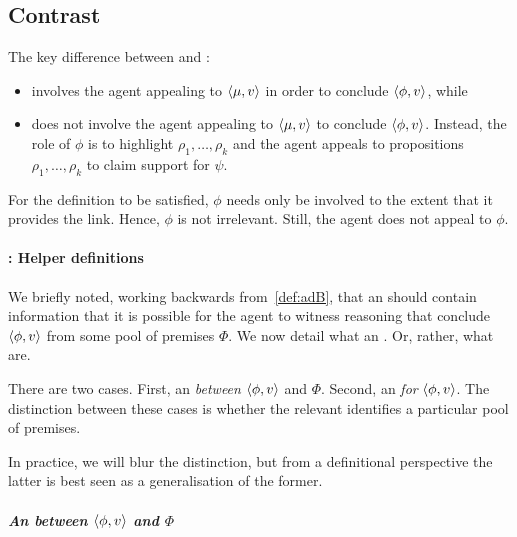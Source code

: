 \subsection{Contrast}

\begin{note}
  The key difference between \adA{} and \adB{}:
  \begin{itemize}
  \item \adA{} involves the agent appealing to \(\langle \mu, v \rangle\) in order to conclude \(\langle \phi, v \rangle\), while
  \item \adB{} does not involve the agent appealing to \(\langle \mu, v \rangle\) to conclude \(\langle \phi, v \rangle\).
    Instead, the role of \(\phi\) is to highlight \(\rho_{1},\dots,\rho_{k}\) and the agent appeals to propositions \(\rho_{1},\dots,\rho_{k}\) to claim support for \(\psi\).
  \end{itemize}

  For the definition to be satisfied, \(\phi\) needs only be involved to the extent that it provides the link.
  Hence, \(\phi\) is not irrelevant.
  Still, the agent does not appeal to \(\phi\).
\end{note}

\paragraph*{\adB{}: Helper definitions}

\begin{note}[]
  We briefly noted, working backwards from~\autoref{def:adB}, that an \itp{} should contain information that it is possible for the agent to witness reasoning that conclude \(\langle \phi, v \rangle\) from some pool of premises \(\Phi\).
  We now detail what an .
  Or, rather, what  are.

  There are two cases.
  First, an  \emph{between} \(\langle \phi, v \rangle\) and \(\Phi\).
  Second, an  \emph{for} \(\langle \phi, v \rangle\).
  The distinction between these cases is whether the relevant  identifies a particular pool of premises.

  In practice, we will blur the distinction, but from a definitional perspective the latter is best seen as a generalisation of the former.
\end{note}

\subparagraph*{An  between \(\langle \phi, v \rangle\) and \(\Phi\)}

